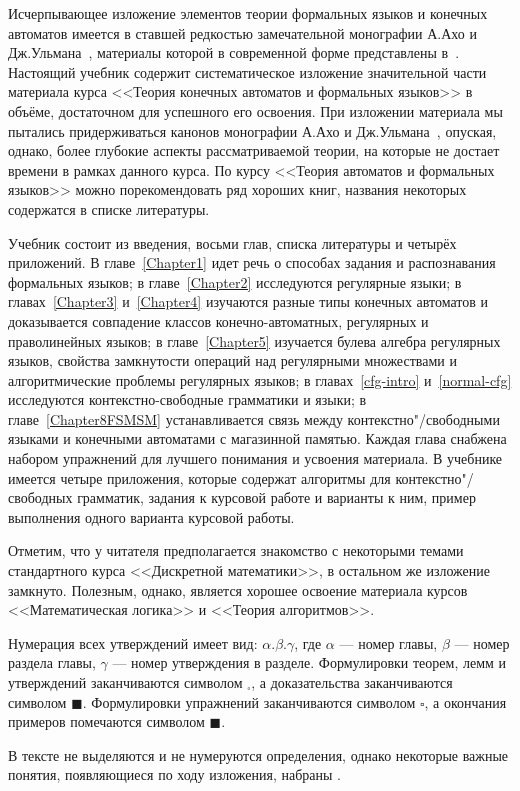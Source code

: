Исчерпывающее изложение элементов теории формальных языков и конечных автоматов имеется в ставшей редкостью замечательной монографии А.Ахо и Дж.Ульмана~\cite{AU}, материалы которой в современной форме представлены в~\cite{Hop}. Настоящий учебник содержит систематическое изложение значительной части материала курса <<Теория конечных автоматов и формальных языков>> в объёме, достаточном для успешного его освоения. При изложении материала мы пытались придерживаться канонов монографии А.Ахо и Дж.Ульмана~\cite{AU}, опуская, однако, более глубокие аспекты рассматриваемой теории, на которые не достает времени в рамках данного курса. По курсу <<Теория автоматов и формальных языков>> можно порекомендовать ряд хороших книг, названия некоторых содержатся в списке литературы. 

Учебник состоит из введения, восьми глав, списка литературы и четырёх приложений. В главе~\ref{Chapter1} идет речь о способах задания и распознавания формальных языков; в главе~\ref{Chapter2} исследуются регулярные языки; в главах~\ref{Chapter3} и~\ref{Chapter4} изучаются разные типы конечных автоматов и доказывается совпадение классов конечно-автоматных, регулярных и праволинейных языков; в главе~\ref{Chapter5} изучается булева алгебра регулярных языков, свойства замкнутости операций над регулярными множествами и алгоритмические проблемы регулярных языков; в главах~\ref{cfg-intro} и~\ref{normal-cfg} исследуются контекстно-свободные грамматики и языки; в главе~\ref{Chapter8FSMSM} устанавливается связь между контекстно"/свободными языками и конечными автоматами с магазинной памятью. Каждая глава снабжена набором упражнений для лучшего понимания и усвоения материала. В учебнике имеется четыре приложения, которые содержат алгоритмы для контекстно"/свободных грамматик, задания к курсовой работе и варианты к ним, пример выполнения одного варианта курсовой работы.

Отметим, что у читателя предполагается знакомство с некоторыми темами стандартного курса <<Дискретной математики>>, в остальном же изложение замкнуто. Полезным, однако, является хорошее освоение материала курсов <<Математическая логика>> и <<Теория алгоритмов>>.

Нумерация всех утверждений имеет вид: $\alpha.\beta.\gamma$, где $\alpha$ --- номер главы, $\beta$ --- номер раздела главы, $\gamma$ --- номер утверждения в разделе. Формулировки теорем, лемм и утверждений заканчиваются символом $_\square$, а доказательства заканчиваются символом $\blacksquare$. Формулировки упражнений заканчиваются символом $\square$, а окончания примеров помечаются символом $\blacksquare$.

В тексте не выделяются и не нумеруются определения, однако некоторые важные понятия, появляющиеся по ходу изложения, набраны .
